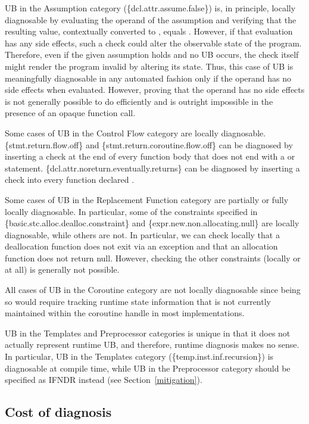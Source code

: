 UB in the Assumption category (\{dcl.attr.assume.false\}) is, in principle, locally diagnosable by evaluating the operand of the assumption and verifying that the resulting value, contextually converted to , equals . However, if that evaluation has any side effects, such a check could alter the observable state of the program. Therefore, even if the given assumption holds and no UB occurs, the check itself might render the program invalid by altering its state. Thus, this case of UB is  meaningfully diagnosable in any automated fashion only if the operand has no side effects when evaluated. However, proving that the operand has no side effects is not generally possible to do efficiently and is outright impossible in the presence of an opaque function call.

Some cases of UB in the Control Flow category are locally diagnosable. \{stmt.return.flow.off\} and \{stmt.return.coroutine.flow.off\} can be diagnosed by inserting a check at the end of every function body that does not end with a  or  statement. \{dcl.attr.noreturn.eventually.returns\} can be diagnosed by inserting a check into every function declared \tcode{[[noreturn]]}.

Some cases of UB in the Replacement Function category are partially or fully locally diagnosable. In particular, some of the constraints specified in \{basic.stc.alloc.dealloc.constraint\} and \{expr.new.non.allocating.null\} are locally diagnosable, while others are not. In particular, we can check locally that a deallocation function does not exit via an exception and that an allocation function does not return null. However, checking the other constraints (locally or at all) is generally not possible.

All cases of UB in the Coroutine category are not locally diagnosable since being so would require tracking runtime state information that is not currently maintained within the coroutine handle in most implementations.

UB in the Templates and Preprocessor categories is unique in that it does not actually represent runtime UB, and therefore, runtime diagnosis makes no sense. In particular, UB in the Templates category (\{temp.inst.inf.recursion\}) is diagnosable at compile time, while UB in the Preprocessor category should be specified as IFNDR instead (see Section~\ref{mitigation}).

\subsection{Cost of diagnosis}
\label{cost}

